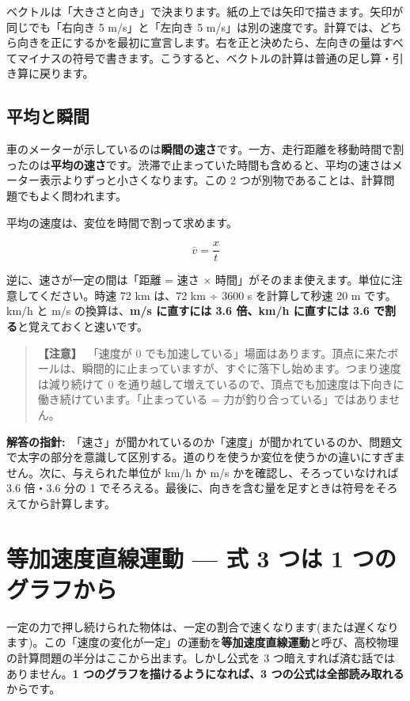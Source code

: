 \documentclass{article}
\begin{document}
ベクトルは「大きさと向き」で決まります。紙の上では矢印で描きます。矢印が同じでも「右向き 5 m/s」と「左向き 5 m/s」は別の速度です。計算では、どちら向きを正にするかを最初に宣言します。右を正と決めたら、左向きの量はすべてマイナスの符号で書きます。こうすると、ベクトルの計算は普通の足し算・引き算に戻ります。

\subsection{平均と瞬間}

車のメーターが示しているのは\textbf{瞬間の速さ}です。一方、走行距離を移動時間で割ったのは\textbf{平均の速さ}です。渋滞で止まっていた時間も含めると、平均の速さはメーター表示よりずっと小さくなります。この 2 つが別物であることは、計算問題でもよく問われます。

平均の速度は、変位を時間で割って求めます。

\[ \bar{v} = \frac{x}{t} \]

逆に、速さが一定の間は「距離 = 速さ × 時間」がそのまま使えます。単位に注意してください。時速 72 km は、72 km ÷ 3600 s を計算して秒速 20 m です。km/h と m/s の換算は、\textbf{m/s に直すには 3.6 倍、km/h に直すには 3.6 で割る}と覚えておくと速いです。

\begin{quote}
\textbf{【注意】}\ 「速度が 0 でも加速している」場面はあります。頂点に来たボールは、瞬間的に止まっていますが、すぐに落下し始めます。つまり速度は減り続けて 0 を通り越して増えているので、頂点でも加速度は下向きに働き続けています。「止まっている = 力が釣り合っている」ではありません。
\end{quote}

\textbf{解答の指針:}\ 「速さ」が聞かれているのか「速度」が聞かれているのか、問題文で太字の部分を意識して区別する。道のりを使うか変位を使うかの違いにすぎません。次に、与えられた単位が km/h か m/s かを確認し、そろっていなければ 3.6 倍・3.6 分の 1 でそろえる。最後に、向きを含む量を足すときは符号をそろえてから計算します。

\section{等加速度直線運動 — 式 3 つは 1 つのグラフから}

一定の力で押し続けられた物体は、一定の割合で速くなります(または遅くなります)。この「速度の変化が一定」の運動を\textbf{等加速度直線運動}と呼び、高校物理の計算問題の半分はここから出ます。しかし公式を 3 つ暗えすれば済む話ではありません。\textbf{1 つのグラフを描けるようになれば、3 つの公式は全部読み取れる}からです。
\end{document}
